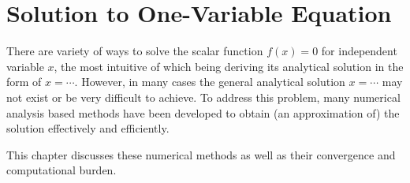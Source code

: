 \chapter{Solution to One-Variable Equation}

There are variety of ways to solve the scalar function $f(x)=0$ for independent variable $x$, the most intuitive of which being deriving its analytical solution in the form of $x=\cdots$. However, in many cases the general analytical solution $x=\cdots$ may not exist or be very difficult to achieve. To address this problem, many numerical analysis based methods have been developed to obtain (an approximation of) the solution effectively and efficiently.

This chapter discusses these numerical methods as well as their convergence and computational burden. 